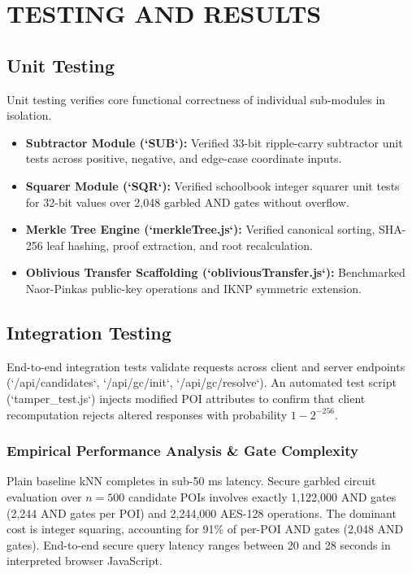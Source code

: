 \documentclass[12pt,a4paper,oneside]{report}
\begin{document}
\chapter{TESTING AND RESULTS}

\section{Unit Testing}
Unit testing verifies core functional correctness of individual sub-modules in isolation.
\begin{itemize}
    \item \textbf{Subtractor Module (`SUB`):} Verified 33-bit ripple-carry subtractor unit tests across positive, negative, and edge-case coordinate inputs.
    \item \textbf{Squarer Module (`SQR`):} Verified schoolbook integer squarer unit tests for 32-bit values over 2,048 garbled AND gates without overflow.
    \item \textbf{Merkle Tree Engine (`merkleTree.js`):} Verified canonical sorting, SHA-256 leaf hashing, proof extraction, and root recalculation.
    \item \textbf{Oblivious Transfer Scaffolding (`obliviousTransfer.js`):} Benchmarked Naor-Pinkas public-key operations and IKNP symmetric extension.
\end{itemize}

\section{Integration Testing}
End-to-end integration tests validate requests across client and server endpoints (`/api/candidates`, `/api/gc/init`, `/api/gc/resolve`). An automated test script (`tamper_test.js`) injects modified POI attributes to confirm that client recomputation rejects altered responses with probability $1 - 2^{-256}$.

\subsection{Empirical Performance Analysis \& Gate Complexity}
Plain baseline kNN completes in sub-50 ms latency. Secure garbled circuit evaluation over $n=500$ candidate POIs involves exactly 1,122,000 AND gates (2,244 AND gates per POI) and 2,244,000 AES-128 operations. The dominant cost is integer squaring, accounting for 91\% of per-POI AND gates (2,048 AND gates). End-to-end secure query latency ranges between 20 and 28 seconds in interpreted browser JavaScript.
\end{document}
